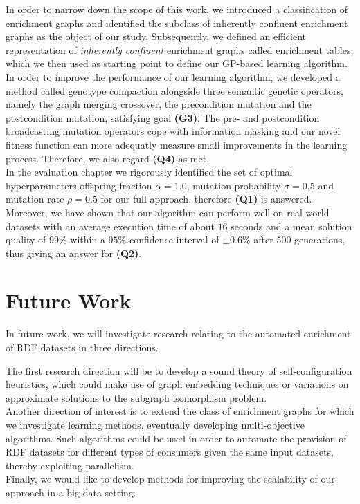 In order to narrow down the scope of this work, we introduced a classification of enrichment graphs and identified the subclass of inherently confluent enrichment graphs as the object of our study.
Subsequently, we defined an efficient representation of \emph{inherently confluent} enrichment graphs called enrichment tables, which we then used as starting point to define our \acf{GP}-based learning algorithm.\\

In order to improve the performance of our learning algorithm, we developed a method called genotype compaction alongside three semantic genetic operators, namely the graph merging crossover, the precondition mutation and the postcondition mutation, satisfying goal \textbf{(G3)}.
The pre- and postcondition broadcasting mutation operators cope with information masking and our novel fitness function can more adequatly measure small improvements in the learning process.
Therefore, we also regard \textbf{(Q4)} as met. \\

In the evaluation chapter we rigorously identified the set of optimal hyperparameters offspring fraction $\alpha=1.0$, mutation probability $\sigma=0.5$ and mutation rate $\rho=0.5$ for our full approach, therefore \textbf{(Q1)} is answered.
Moreover, we have shown that our algorithm can perform well on real world datasets with an average execution time of about $16$ seconds and a mean solution quality of $99\%$ within a $95\%$-confidence interval of $\pm 0.6\%$ after 500 generations, thus giving an answer for \textbf{(Q2)}.


\section{Future Work}
\label{sec:futurework}

In future work, we will investigate research relating to the automated enrichment of \ac{RDF} datasets in three directions.

The first research direction will be to develop a sound theory of self-configuration heuristics, which could \eg make use of graph embedding techniques or variations on approximate solutions to the subgraph isomorphism problem.\\

Another direction of interest is to extend the class of enrichment graphs for which we investigate learning methods, eventually developing multi-objective algorithms.
Such algorithms could be used in order to automate the provision of \ac{RDF} datasets for different types of consumers given the same input datasets, thereby exploiting parallelism.\\

Finally, we would like to develop methods for improving the scalability of our approach in a big data setting.